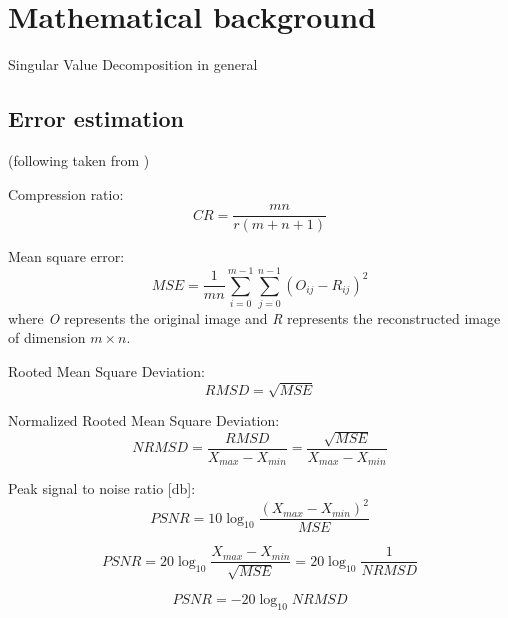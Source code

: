 \section{Mathematical background}
\label{section:math}

Singular Value Decomposition in general


\subsection{Error estimation}

(following taken from \cite{SairaBanu2015})

Compression ratio:
$$CR=\frac{m n}{r(m+n+1)}$$

Mean square error:
$$MSE=\frac{1}{m n} \sum_{i=0}^{m-1} \sum_{j=0}^{n-1} (O_{ij} - R_{ij})^{2}$$
where \textit{O} represents the original image and \textit{R} represents the
reconstructed image of dimension $m \times n$.

Rooted Mean Square Deviation:
$$RMSD=\sqrt{MSE}$$

Normalized Rooted Mean Square Deviation:
$$NRMSD=\frac{RMSD}{X_{max}-X_{min}}=\frac{\sqrt{MSE}}{X_{max}-X_{min}}$$

Peak signal to noise ratio [db]:
$$PSNR=10\log_{10}\frac{(X_{max}-X_{min})^{2}}{MSE}$$

$$PSNR=20\log_{10}\frac{X_{max}-X_{min}}{\sqrt{MSE}}=20\log_{10}\frac{1}{NRMSD}$$

$$PSNR=-20\log_{10}NRMSD$$


